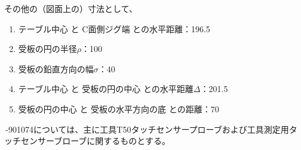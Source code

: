 \clearpage
\begin{hosoku}
その他の（図面上の）寸法として、
\begin{enumerate}
\item テーブル中心 と C面側ジグ端 との水平距離：196.5
\item 受板の円の半径$\rho$：100
\item 受板の鉛直方向の幅$\sigma$：40
\item テーブル中心 と 受板の円の中心 との水平距離$\Delta$：201.5
\item 受板の円の中心 と 受板の水平方向の底 との距離：70
\end{enumerate}
\end{hosoku}



\clearpage
\,-\ttNum901074については、主に工具{\ttfamily T50}タッチセンサープローブおよび工具測定用タッチセンサーブローブに関するものとする。

